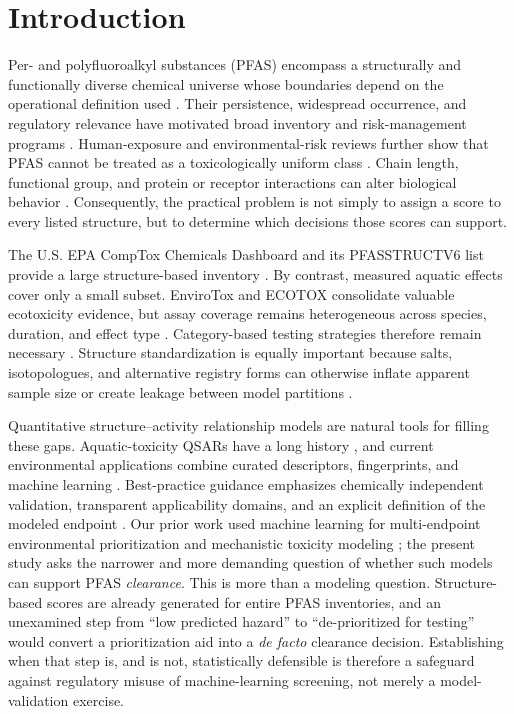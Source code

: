 \documentclass[journal=esthag,manuscript=article,margin=1in]{achemso}
\begin{document}
\section{Introduction}

Per- and polyfluoroalkyl substances (PFAS) encompass a structurally and functionally diverse chemical universe whose boundaries depend on the operational definition used \cite{buck2011terminology,oecd2021pfas}. Their persistence, widespread occurrence, and regulatory relevance have motivated broad inventory and risk-management programs \cite{wang2017never,cousins2022planetary,epa2021roadmap}. Human-exposure and environmental-risk reviews further show that PFAS cannot be treated as a toxicologically uniform class \cite{sunderland2019exposure,brendel2018short,gomis2018potency,conder2008pfca}. Chain length, functional group, and protein or receptor interactions can alter biological behavior \cite{cheng2018protein,wolf2008ppar,vandenheuvel2006ppar}. Consequently, the practical problem is not simply to assign a score to every listed structure, but to determine which decisions those scores can support.

The U.S. EPA CompTox Chemicals Dashboard and its PFASSTRUCTV6 list provide a large structure-based inventory \cite{williams2017comptox,epacomptox2026}. By contrast, measured aquatic effects cover only a small subset. EnviroTox and ECOTOX consolidate valuable ecotoxicity evidence, but assay coverage remains heterogeneous across species, duration, and effect type \cite{connors2019envirotox,olker2022ecotox}. Category-based testing strategies therefore remain necessary \cite{patlewicz2019category}. Structure standardization is equally important because salts, isotopologues, and alternative registry forms can otherwise inflate apparent sample size or create leakage between model partitions \cite{mceachran2018msready}.

Quantitative structure--activity relationship models are natural tools for filling these gaps. Aquatic-toxicity QSARs have a long history \cite{mazzatorta2005aquatic,nath2023aquatic}, and current environmental applications combine curated descriptors, fingerprints, and machine learning \cite{mansouri2018opera,ms2tox2022}. Best-practice guidance emphasizes chemically independent validation, transparent applicability domains, and an explicit definition of the modeled endpoint \cite{tropsha2010best,cherkasov2014qsar}. Our prior work used machine learning for multi-endpoint environmental prioritization and mechanistic toxicity modeling \cite{kim2026dualthreat,jang2025opqsar}; the present study asks the narrower and more demanding question of whether such models can support PFAS \emph{clearance}. This is more than a modeling question. Structure-based scores are already generated for entire PFAS inventories, and an unexamined step from ``low predicted hazard'' to ``de-prioritized for testing'' would convert a prioritization aid into a \emph{de facto} clearance decision. Establishing when that step is, and is not, statistically defensible is therefore a safeguard against regulatory misuse of machine-learning screening, not merely a model-validation exercise.
\end{document}
